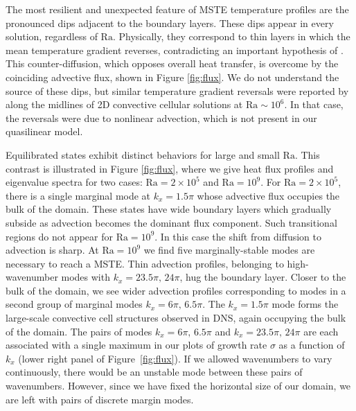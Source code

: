 \documentclass[reprint,amsmath,amssymb,aps]{revtex4-1}
\newcommand\Ra{\mathrm{Ra}}
\begin{document}
The most resilient and unexpected feature of MSTE temperature profiles are the pronounced dips adjacent to the boundary layers. 
These dips appear in every solution, regardless of $\Ra$. 
Physically, they correspond to thin layers in which the mean temperature gradient reverses, contradicting an important hypothesis of \cite{Malkus_1954,Howard_1966}. 
This counter-diffusion, which opposes overall heat transfer, is overcome by the coinciding advective flux, shown in Figure \ref{fig:flux}. 
We do not understand the source of these dips, but similar temperature gradient reversals were reported by \cite{chini_cells} along the midlines of 2D convective cellular solutions at $\Ra \sim 10^6$.
In that case, the reversals were due to nonlinear advection, which is not present in our quasilinear model. 

Equilibrated states exhibit distinct behaviors for large and small $\Ra$. 
This contrast is illustrated in Figure \ref{fig:flux}, where we give heat flux profiles and eigenvalue spectra for two cases: $\Ra = 2 \times 10^5$ and $\Ra = 10^9$. 
For $\Ra = 2 \times 10^5$, there is a single marginal mode at $k_x = 1.5\pi$ whose advective flux occupies the bulk of the domain. 
These states have wide boundary layers which gradually subside as advection becomes the dominant flux component. 
Such transitional regions do not appear for $\Ra = 10^9$.
In this case the shift from diffusion to advection is sharp.
At $\Ra=10^9$ we find five marginally-stable modes are necessary to reach a MSTE.
Thin advection profiles, belonging to high-wavenumber modes with $k_x=23.5\pi, \, 24\pi$, hug the boundary layer. 
Closer to the bulk of the domain, we see wider advection profiles corresponding to modes in a second group of marginal modes $k_x = 6\pi, \, 6.5\pi$.
The $k_x = 1.5\pi$ mode forms the large-scale convective cell structures observed in DNS, again occupying the bulk of the domain.
The pairs of modes $k_x = 6\pi, \, 6.5\pi$ and $k_x=23.5\pi, \, 24\pi$ are each associated with a single maximum in our plots of growth rate $\sigma$ as a function of $k_x$ (lower right panel of Figure~\ref{fig:flux}).
If we allowed wavenumbers to vary continuously, there would be an unstable mode between these pairs of wavenumbers.
However, since we have fixed the horizontal size of our domain, we are left with pairs of discrete margin modes.
\end{document}
